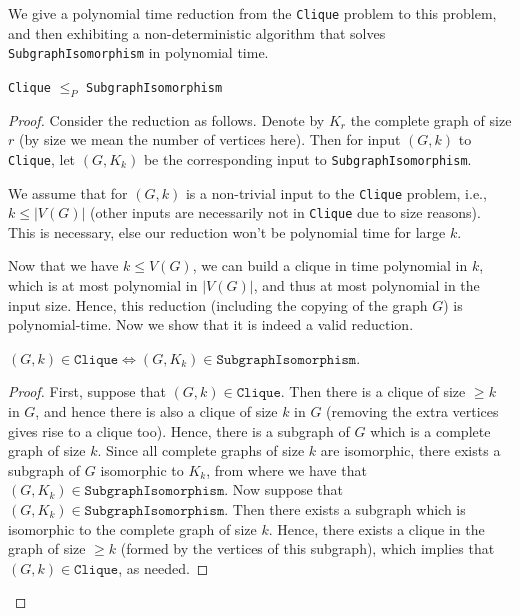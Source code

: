 \begin{soln}
    We give a polynomial time reduction from the \texttt{Clique} problem to this problem, and then exhibiting a non-deterministic algorithm that solves \texttt{SubgraphIsomorphism} in
    polynomial time.\nl
    \begin{claim}
        \texttt{Clique} $\le_P$ \texttt{SubgraphIsomorphism}
    \end{claim}
    \begin{proof}
        Consider the reduction as follows. Denote by $K_r$ the complete graph of size $r$ (by size we mean the number of vertices here). Then for input $(G, k)$ to \texttt{Clique}, let $(G, K_k)$ be the corresponding input to
        \texttt{SubgraphIsomorphism}.\nl 
        \begin{note}
            We assume that for $(G, k)$ is a non-trivial input to the \texttt{Clique} problem, i.e., $k \le |V(G)|$ (other inputs are necessarily not in \texttt{Clique} due to size reasons). This is
            necessary, else our reduction won't be polynomial time for large $k$.
        \end{note}
        Now that we have $k \le V(G)$, we can build a clique in time polynomial in $k$, which is at most polynomial in $|V(G)|$, and thus at most polynomial in the input size. Hence, this
        reduction (including the copying of the graph $G$) is polynomial-time. Now we show that it is indeed a valid reduction.\nl
        \begin{claim}
            $(G, k) \in \texttt{Clique} \iff (G, K_k) \in \texttt{SubgraphIsomorphism}$.
        \end{claim}
        \begin{proof}
            First, suppose that $(G, k) \in \texttt{Clique}$. Then there is a clique of size $\ge k$ in $G$, and hence there is also a clique of size $k$ in $G$ (removing the extra vertices
            gives rise to a clique too). Hence, there is a subgraph of $G$ which is a complete graph of size $k$. Since all complete graphs of size $k$ are isomorphic, there exists a subgraph of $G$
            isomorphic to $K_k$, from where we have that $(G, K_k) \in \texttt{SubgraphIsomorphism}$.\nl
            Now suppose that $(G, K_k) \in \texttt{SubgraphIsomorphism}$. Then there exists a subgraph which is isomorphic to the complete graph of size $k$. Hence, there exists a clique in the
            graph of size $\ge k$ (formed by the vertices of this subgraph), which implies that $(G, k) \in \texttt{Clique}$, as needed.
        \end{proof}

\end{proof}
\end{soln}
